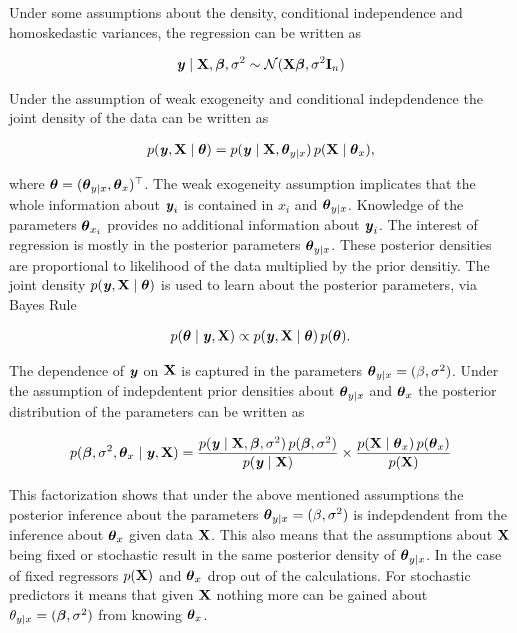 \documentclass[11pt,a4paper,twoside]{book}
\begin{document}
Under some assumptions about the density, conditional independence and homoskedastic variances, the regression can be written as

       \begin{align} 
{\textbf{\textit{y}}} \mid {\mathbf{X}} , {\boldsymbol{\beta}}, \sigma^2 \sim \mathcal{N}({\mathbf{X}} {\boldsymbol{\beta}} , \sigma^2 {\mathbf{I}}_{n})
   \end{align}

Under the assumption of weak exogeneity and conditional indepdendence the joint density of the data can be written as

       \begin{align} 
p({\textbf{\textit{y}}}, {\mathbf{X}} \mid {\boldsymbol{\theta}}{}) = p({\textbf{\textit{y}}} \mid {\mathbf{X}}, {\boldsymbol{\theta}}{}_{y \mid x}) \, p({\mathbf{X}} \mid {\boldsymbol{\theta}}{}_{x}),
   \end{align}

where ${\boldsymbol{\theta}}{} = ({\boldsymbol{\theta}}{}_{y \mid x}, {\boldsymbol{\theta}}{}_{x})^\top$. The weak exogeneity assumption implicates that the whole information about ${\textbf{\textit{y}}}_{i}$ is contained in $x_{i}$ and ${\boldsymbol{\theta}}{}_{y \mid x}$. Knowledge of the parameters ${\boldsymbol{\theta}}{}_{x_{i}}$ provides no additional information about ${\textbf{\textit{y}}}_{i}$.
The interest of regression is mostly in the posterior parameters ${\boldsymbol{\theta}}{}_{y \mid x}$. These posterior densities are proportional to  likelihood of the data  multiplied by the prior densitiy. The joint density $p({\textbf{\textit{y}}}, {\mathbf{X}} \mid  {\boldsymbol{\theta}}{})$ is used to learn about the posterior parameters, via Bayes Rule

       \begin{align} 
p({\boldsymbol{\theta}}{} \mid {\textbf{\textit{y}}}, {\mathbf{X}}) \propto p({\textbf{\textit{y}}}, {\mathbf{X}} \mid  {\boldsymbol{\theta}}{}) \, p({\boldsymbol{\theta}}{}).
   \end{align}
   
   The dependence of ${\textbf{\textit{y}}}$ on ${\mathbf{X}}$ is captured in the parameters ${\boldsymbol{\theta}}{}_{y \mid x} = (\beta, \sigma^2)$. Under the assumption of indepdentent prior densities about ${\boldsymbol{\theta}}{}_{y \mid x}$ and ${\boldsymbol{\theta}}{}_{x}$ the posterior distribution of the parameters can be written as
   
          \begin{align} 
p({\boldsymbol{\beta}}, \sigma^2, {\boldsymbol{\theta}}{}_{x} \mid {\textbf{\textit{y}}}, {\mathbf{X}}) = \frac{p({\textbf{\textit{y}}} \mid {\mathbf{X}}, {\boldsymbol{\beta}}, \sigma^2) \, p({\boldsymbol{\beta}}, \sigma^2)}{p({\textbf{\textit{y}}} \mid {\mathbf{X}})} \times \frac{p({\mathbf{X}} \mid {\boldsymbol{\theta}}{}_{x}) \, p({\boldsymbol{\theta}}{}_{x})}{p({\mathbf{X}})}
   \end{align}
   
  This factorization shows that under the above mentioned assumptions the posterior inference about the parameters ${\boldsymbol{\theta}}{}_{y \mid x} = (\beta, \sigma^2)$ is indepdendent from the inference about ${\boldsymbol{\theta}}{}_{x}$ given data ${\mathbf{X}}$. This also means that the assumptions about ${\mathbf{X}}$ being fixed or stochastic result in the same posterior density of  ${\boldsymbol{\theta}}{}_{y \mid x}$. In the case of fixed regressors $p({\mathbf{X}})$ and ${\boldsymbol{\theta}}{}_{x}$ drop out of the calculations. For stochastic predictors it means that given ${\mathbf{X}}$ nothing more can be gained about $\theta_{y \mid x} = ({\boldsymbol{\beta}}, \sigma^2)$ from knowing ${\boldsymbol{\theta}}{}_{x}$. 
  
\end{document}
